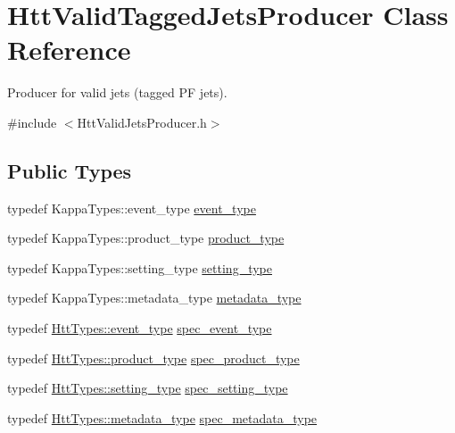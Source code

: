 \hypertarget{classHttValidTaggedJetsProducer}{
\section{HttValidTaggedJetsProducer Class Reference}
\label{classHttValidTaggedJetsProducer}
}


Producer for valid jets (tagged PF jets).  


{\ttfamily \#include $<$HttValidJetsProducer.h$>$}\subsection*{Public Types}
\begin{DoxyCompactItemize}
\item 
typedef KappaTypes::event\_\-type \hyperlink{classHttValidTaggedJetsProducer_a3bc1d36fed6d4f463a6a31a9d6198e44}{event\_\-type}
\item 
typedef KappaTypes::product\_\-type \hyperlink{classHttValidTaggedJetsProducer_a0a3a5df44dc79ee735fb2d118df5e2e9}{product\_\-type}
\item 
typedef KappaTypes::setting\_\-type \hyperlink{classHttValidTaggedJetsProducer_aaf69d5b37684a121c6bf3651ece90d0c}{setting\_\-type}
\item 
typedef KappaTypes::metadata\_\-type \hyperlink{classHttValidTaggedJetsProducer_afd0b781e5d24d02788c7e29a4634389a}{metadata\_\-type}
\item 
typedef \hyperlink{classHttEvent}{HttTypes::event\_\-type} \hyperlink{classHttValidTaggedJetsProducer_a95e02c3a94940ce84957fe4cb679a9b2}{spec\_\-event\_\-type}
\item 
typedef \hyperlink{classHttProduct}{HttTypes::product\_\-type} \hyperlink{classHttValidTaggedJetsProducer_ada9e2693d7c7aedf7af4e44ebaaa607e}{spec\_\-product\_\-type}
\item 
typedef \hyperlink{classHttSettings}{HttTypes::setting\_\-type} \hyperlink{classHttValidTaggedJetsProducer_a52160fd334e90f431a142b41f203eb45}{spec\_\-setting\_\-type}
\item 
typedef \hyperlink{classHttMetadata}{HttTypes::metadata\_\-type} \hyperlink{classHttValidTaggedJetsProducer_ab4da305e888b2abd7a39a72ab1c0bea4}{spec\_\-metadata\_\-type}
\end{DoxyCompactItemize}
